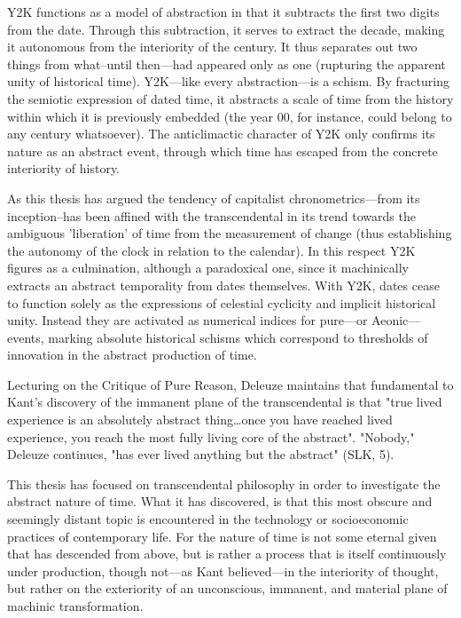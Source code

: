 Y2K functions as a model of abstraction in that it subtracts the first two
digits from the date. Through this subtraction, it serves to extract the decade, making it autonomous from the interiority of the century. It thus separates out two things from what--until then---had appeared only as one (rupturing the apparent unity of historical time). Y2K---like every abstraction---is a schism. By fracturing the semiotic expression of dated time, it abstracts a scale of time from the history within which it is previously embedded (the year 00, for instance, could belong to any century whatsoever). The anticlimactic character of Y2K only confirms its nature as an abstract event, through which time has escaped from the concrete interiority of history.

As this thesis has argued the tendency of capitalist chronometrics---from its inception--has been affined with the transcendental in its trend towards the ambiguous 'liberation' of time from the measurement of change (thus establishing the autonomy of the clock in relation to the calendar). In this respect Y2K figures as a culmination, although a paradoxical one, since it machinically extracts an abstract temporality from dates themselves. With Y2K, dates cease to function solely as the expressions of celestial cyclicity and implicit historical unity. Instead they are activated as numerical indices for pure---or Aeonic---events, marking absolute historical schisms which correspond to thresholds of
innovation in the abstract production of time.

Lecturing on the Critique of Pure Reason, Deleuze maintains that fundamental to Kant's discovery of the immanent plane of the transcendental is that "true lived experience is an absolutely abstract thing\dots once you have reached lived experience, you reach the most fully living core of the abstract".
"Nobody," Deleuze continues, "has ever lived anything but the abstract" (SLK, 5).

This thesis has focused on transcendental philosophy in order to investigate the abstract nature of time. What it has discovered, is that this most obscure and seemingly distant topic is encountered in the technology or socioeconomic practices of contemporary life. For the nature of time is not some eternal given that has descended from above, but is rather a process that is itself continuously under production, though not---as Kant believed---in the interiority of thought, but rather on the exteriority of an unconscious, immanent, and material plane of machinic transformation. 